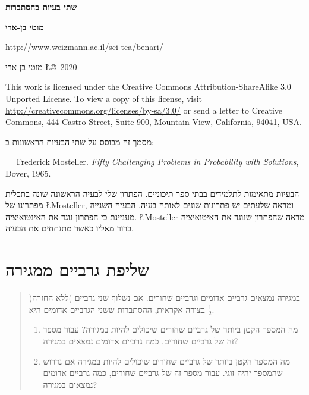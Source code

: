 \documentclass[11pt,a4paper]{article}
\begin{document}
\thispagestyle{empty}

\begin{center}
\textbf{\LARGE שתי בעיות בהסתברות}

\bigskip

\textbf{\large מוטי בן-ארי}

\bigskip

\url{http://www.weizmann.ac.il/sci-tea/benari/}

\smallskip

\begin{footnotesize}
מוטי בן-ארי
\L{\copyright{}\ 2020 }
\end{footnotesize}
\end{center}

\begin{footnotesize}
This work is licensed under the Creative Commons Attribution-ShareAlike 3.0 Unported License. To view a copy of this license, visit \url{http://creativecommons.org/licenses/by-sa/3.0/} or send a letter to Creative Commons, 444 Castro Street, Suite 900, Mountain View, California, 94041, USA.
\end{footnotesize}


\bigskip
\bigskip

מסמך זה מבוסס על שתי הבעיות הראשונות ב:

$\quad$ Frederick Mosteller. \textit{Fifty Challenging Problems in Probability with Solutions}, Dover, 1965.

הבעיות מתאימות לתלמידים בבתי ספר תיכוניים. הפתרון שלי לבעיה הראשונה שונה בתכלית מפתרונו של
\L{Mosteller},
ומראה שלעתים יש פתרונות שונים לאותה בעיה. הבעיה השנייה מעניינת כי הפתרון נוגד את האינטואיציה.
\L{Mosteller}
מראה שהפתרון שנוגד את האיטואיציה ברור מאליו כאשר מתנתחים את הבעיה.


\section{שליפת גרביים ממגירה}

\begin{quote}
במגירה נמצאים גרביים אדומים וגרביים שחורים. אם נשלוף שני גרביים )ללא החזרה( בצורה אקראית, ההסתברות ששני הגרביים אדומים היא 
$\frac{1}{2}$. 
\begin{enumerate}
\item 
מה המספר הקטן ביותר של גרביים שחורים שיכולים להיות במגירה? עבור מספר זה של גרביים שחורים, כמה גרביים אדומים נמצאים במגירה?
\item 
מה המספר הקטן ביותר של גרביים שחורים שיכולים להיות במגירה אם נדרוש שהמספר יהיה
\textbf{זוגי}.
עבור מספר זה של גרביים שחורים, כמה גרביים אדומים נמצאים במגירה?
\end{enumerate}
\end{quote}
\end{document}
